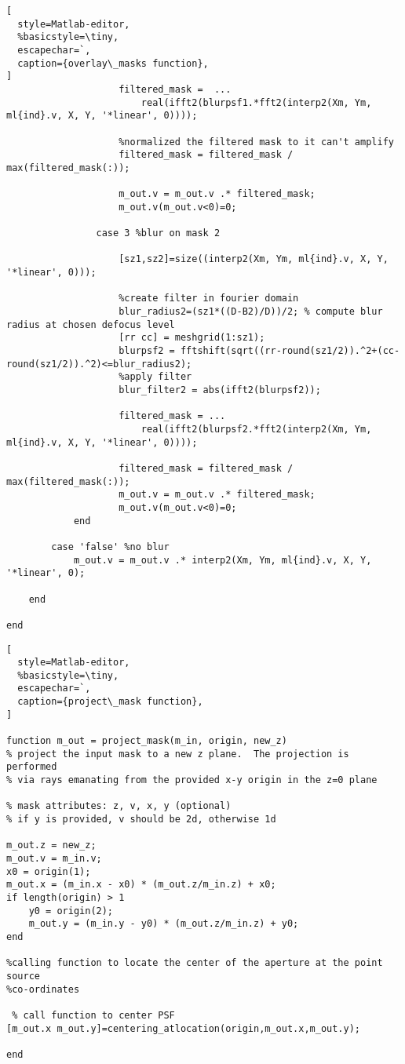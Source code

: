 \begin{lstlisting}[
  style=Matlab-editor,
  %basicstyle=\tiny,
  escapechar=`,
  caption={overlay\_masks function},
]
                    filtered_mask =  ...
						real(ifft2(blurpsf1.*fft2(interp2(Xm, Ym, ml{ind}.v, X, Y, '*linear', 0))));
                    
                    %normalized the filtered mask to it can't amplify
                    filtered_mask = filtered_mask / max(filtered_mask(:));
                    
                    m_out.v = m_out.v .* filtered_mask;
                    m_out.v(m_out.v<0)=0;
                    
                case 3 %blur on mask 2
                    
                    [sz1,sz2]=size((interp2(Xm, Ym, ml{ind}.v, X, Y, '*linear', 0)));
                    
                    %create filter in fourier domain
                    blur_radius2=(sz1*((D-B2)/D))/2; % compute blur radius at chosen defocus level
                    [rr cc] = meshgrid(1:sz1);
                    blurpsf2 = fftshift(sqrt((rr-round(sz1/2)).^2+(cc-round(sz1/2)).^2)<=blur_radius2);
                    %apply filter
                    blur_filter2 = abs(ifft2(blurpsf2));
                    
                    filtered_mask = ...
						real(ifft2(blurpsf2.*fft2(interp2(Xm, Ym, ml{ind}.v, X, Y, '*linear', 0))));
                    
                    filtered_mask = filtered_mask / max(filtered_mask(:));
                    m_out.v = m_out.v .* filtered_mask;
                    m_out.v(m_out.v<0)=0;
            end
            
        case 'false' %no blur
            m_out.v = m_out.v .* interp2(Xm, Ym, ml{ind}.v, X, Y, '*linear', 0);
            
    end
    
end

\end{lstlisting}


\begin{lstlisting}[
  style=Matlab-editor,
  %basicstyle=\tiny,
  escapechar=`,
  caption={project\_mask function},
]

function m_out = project_mask(m_in, origin, new_z)
% project the input mask to a new z plane.  The projection is performed
% via rays emanating from the provided x-y origin in the z=0 plane

% mask attributes: z, v, x, y (optional)
% if y is provided, v should be 2d, otherwise 1d

m_out.z = new_z;
m_out.v = m_in.v;
x0 = origin(1);
m_out.x = (m_in.x - x0) * (m_out.z/m_in.z) + x0;
if length(origin) > 1
    y0 = origin(2);
    m_out.y = (m_in.y - y0) * (m_out.z/m_in.z) + y0;
end

%calling function to locate the center of the aperture at the point source
%co-ordinates

 % call function to center PSF 
[m_out.x m_out.y]=centering_atlocation(origin,m_out.x,m_out.y); 

end

\end{lstlisting}

